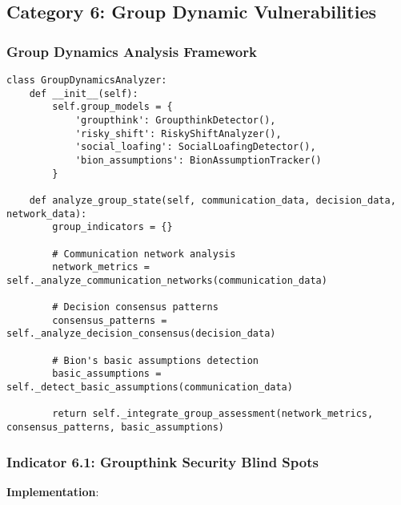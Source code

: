 \documentclass[11pt, onecolumn]{article}
\begin{document}
\subsection{Category 6: Group Dynamic Vulnerabilities}

\subsubsection{Group Dynamics Analysis Framework}

\begin{lstlisting}
class GroupDynamicsAnalyzer:
    def __init__(self):
        self.group_models = {
            'groupthink': GroupthinkDetector(),
            'risky_shift': RiskyShiftAnalyzer(),
            'social_loafing': SocialLoafingDetector(),
            'bion_assumptions': BionAssumptionTracker()
        }
        
    def analyze_group_state(self, communication_data, decision_data, network_data):
        group_indicators = {}
        
        # Communication network analysis
        network_metrics = self._analyze_communication_networks(communication_data)
        
        # Decision consensus patterns
        consensus_patterns = self._analyze_decision_consensus(decision_data)
        
        # Bion's basic assumptions detection
        basic_assumptions = self._detect_basic_assumptions(communication_data)
        
        return self._integrate_group_assessment(network_metrics, consensus_patterns, basic_assumptions)
\end{lstlisting}

\subsubsection{Indicator 6.1: Groupthink Security Blind Spots}

\textbf{Implementation}:
\end{document}

